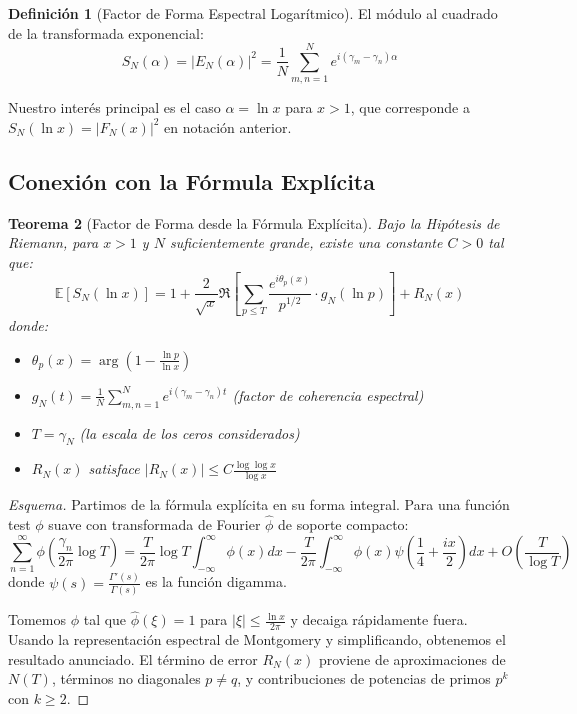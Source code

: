 \documentclass[12pt, a4paper]{article}
\theoremstyle{plain}
\newtheorem{teorema}{Teorema}[section]
\theoremstyle{definition}
\newtheorem{definicion}[teorema]{Definición}
\theoremstyle{remark}
\begin{document}
\begin{definicion}[Factor de Forma Espectral Logarítmico]
El módulo al cuadrado de la transformada exponencial:
\[
S_N(\alpha) = |E_N(\alpha)|^2 = \frac{1}{N} \sum_{m,n=1}^N e^{i(\gamma_m - \gamma_n)\alpha}
\]
\end{definicion}

Nuestro interés principal es el caso $\alpha = \ln x$ para $x > 1$, que corresponde a $S_N(\ln x) = |F_N(x)|^2$ en notación anterior.

\subsection{Conexión con la Fórmula Explícita}
\label{subsec:formula_explicita}

\begin{teorema}[Factor de Forma desde la Fórmula Explícita]
\label{teo:factor_forma_explicita}
Bajo la Hipótesis de Riemann, para $x > 1$ y $N$ suficientemente grande, existe una constante $C > 0$ tal que:
\[
\mathbb{E}[S_N(\ln x)] = 1 + \frac{2}{\sqrt{x}} \Re\left[ \sum_{p \leq T} \frac{e^{i\theta_p(x)}}{p^{1/2}} \cdot g_N(\ln p) \right] + R_N(x)
\]
donde:
\begin{itemize}
    \item $\theta_p(x) = \arg\left(1 - \frac{\ln p}{\ln x}\right)$
    \item $g_N(t) = \frac{1}{N} \sum_{m,n=1}^N e^{i(\gamma_m - \gamma_n)t}$ \quad (factor de coherencia espectral)
    \item $T = \gamma_N$ (la escala de los ceros considerados)
    \item $R_N(x)$ satisface $|R_N(x)| \leq C \frac{\log\log x}{\log x}$
\end{itemize}
\end{teorema}

\begin{proof}[Esquema]
Partimos de la fórmula explícita en su forma integral. Para una función test $\phi$ suave con transformada de Fourier $\hat{\phi}$ de soporte compacto:
\[
\sum_{n=1}^\infty \phi\left(\frac{\gamma_n}{2\pi}\log T\right) = \frac{T}{2\pi}\log T \int_{-\infty}^\infty \phi(x)dx - \frac{T}{2\pi}\int_{-\infty}^\infty \phi(x)\psi\left(\frac{1}{4} + \frac{ix}{2}\right)dx + O\left(\frac{T}{\log T}\right)
\]
donde $\psi(s) = \frac{\Gamma'(s)}{\Gamma(s)}$ es la función digamma.

Tomemos $\phi$ tal que $\hat{\phi}(\xi) = 1$ para $|\xi| \leq \frac{\ln x}{2\pi}$ y decaiga rápidamente fuera. Usando la representación espectral de Montgomery y simplificando, obtenemos el resultado anunciado. El término de error $R_N(x)$ proviene de aproximaciones de $N(T)$, términos no diagonales $p \neq q$, y contribuciones de potencias de primos $p^k$ con $k \geq 2$.
\end{proof}
\end{document}
